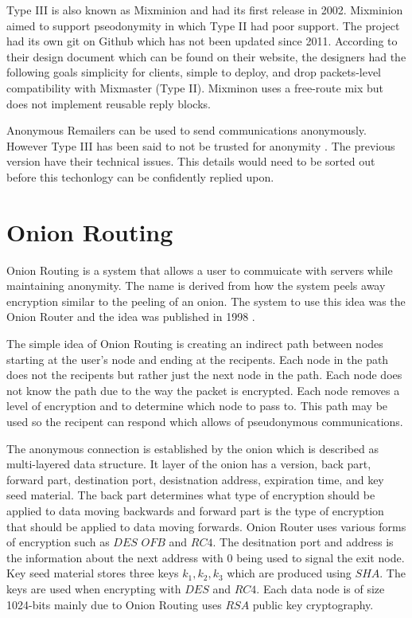 \documentclass[12pt]{article}
\begin{document}
Type III is also known as Mixminion and had its first release in 2002. Mixminion aimed to support pseodonymity in which Type II had poor support\cite{GoldbertTwo}. The project had its own git on Github which has not been updated since 2011. According to their design document which can be found on their website, the designers had the following goals simplicity for clients, simple to deploy, and drop packets-level compatibility with Mixmaster (Type II).  Mixminon uses a free-route mix but does not implement reusable reply blocks.

Anonymous Remailers can be used to send communications anonymously. However Type III  has been said to not be trusted for anonymity \cite{GoldbertTwo}. The previous version have their technical issues. This details would need to be sorted out before this techonlogy can be confidently replied upon.

\section{Onion Routing}\label{}
Onion Routing is a system that allows a user to commuicate with servers while maintaining anonymity. The name is derived from how the system peels away encryption similar to the peeling of an onion. The system to use this idea was the Onion Router and the idea was published in 1998 \cite{Reed}. 

The simple idea of Onion Routing is creating an indirect path between nodes starting at the user's node and ending at the recipents. Each node in the path does not the recipents but rather just the next node in the path. Each node does not know the path due to the way the packet is encrypted. Each node removes a level of encryption and to determine which node to pass to. This path may be used so the recipent can respond which allows of pseudonymous communications.

The anonymous connection is established by the onion which is described as multi-layered data structure. It layer of the onion has a version, back part, forward part, destination port, desistnation address, expiration time, and key seed material. The back part determines what type of encryption should be applied to data moving backwards and forward part is the type of encryption that should be applied to data moving forwards.  Onion Router uses various forms of encryption such as $DES$ $OFB$ and $RC4$\cite{Reed}. The desitnation port and address is the information about the next address with 0 being used to signal the exit node. Key seed material stores three keys $k_1, k_2, k_3$ which are produced using $SHA$. The keys are used when encrypting with $DES$ and $RC4$. Each data node is of size 1024-bits mainly due to Onion Routing uses $RSA$ public key cryptography.
\end{document}
